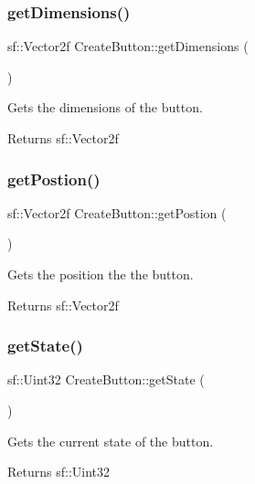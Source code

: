 \subsubsection{\texorpdfstring{get\+Dimensions()}{getDimensions()}}
{\footnotesize\ttfamily sf\+::\+Vector2f Create\+Button\+::get\+Dimensions (\begin{DoxyParamCaption}{ }\end{DoxyParamCaption})}



Gets the dimensions of the button. 

\begin{DoxyReturn}{Returns}
sf\+::\+Vector2f 
\end{DoxyReturn}
\mbox{\label{class_create_button_acb43c6f40f10ca61f3a4a3c0aeb32de9}} 
\subsubsection{\texorpdfstring{get\+Postion()}{getPostion()}}
{\footnotesize\ttfamily sf\+::\+Vector2f Create\+Button\+::get\+Postion (\begin{DoxyParamCaption}{ }\end{DoxyParamCaption})}



Gets the position the the button. 

\begin{DoxyReturn}{Returns}
sf\+::\+Vector2f 
\end{DoxyReturn}
\mbox{\label{class_create_button_a1ba0464fcf148e99b0fcd9fcb9a7b90d}} 
\subsubsection{\texorpdfstring{get\+State()}{getState()}}
{\footnotesize\ttfamily sf\+::\+Uint32 Create\+Button\+::get\+State (\begin{DoxyParamCaption}{ }\end{DoxyParamCaption})}



Gets the current state of the button. 

\begin{DoxyReturn}{Returns}
sf\+::\+Uint32 
\end{DoxyReturn}
\mbox{\label{class_create_button_a084a70a22f429d4641d4f5f992315987}} 
